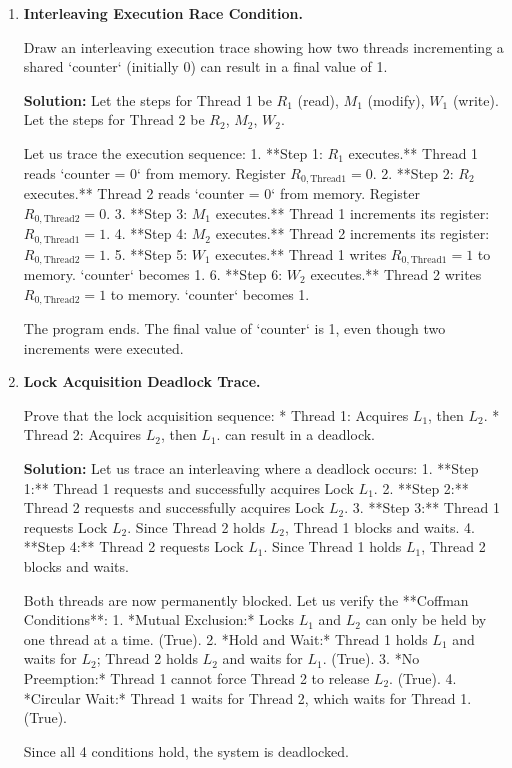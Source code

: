\documentclass[12pt, a4paper]{book}
\begin{document}
\begin{problembox}
\begin{enumerate}[label=\textbf{E\arabic*.}]
  \item \textbf{Interleaving Execution Race Condition.}
  
        Draw an interleaving execution trace showing how two threads incrementing a shared `counter` (initially 0) can result in a final value of 1.
        
        \textbf{Solution:}
        Let the steps for Thread 1 be $R_1$ (read), $M_1$ (modify), $W_1$ (write).
        Let the steps for Thread 2 be $R_2$, $M_2$, $W_2$.
        
        Let us trace the execution sequence:
        1. **Step 1: $R_1$ executes.**
           Thread 1 reads `counter = 0` from memory. Register $R_{0,\text{Thread1}} = 0$.
        2. **Step 2: $R_2$ executes.**
           Thread 2 reads `counter = 0` from memory. Register $R_{0,\text{Thread2}} = 0$.
        3. **Step 3: $M_1$ executes.**
           Thread 1 increments its register: $R_{0,\text{Thread1}} = 1$.
        4. **Step 4: $M_2$ executes.**
           Thread 2 increments its register: $R_{0,\text{Thread2}} = 1$.
        5. **Step 5: $W_1$ executes.**
           Thread 1 writes $R_{0,\text{Thread1}} = 1$ to memory. `counter` becomes 1.
        6. **Step 6: $W_2$ executes.**
           Thread 2 writes $R_{0,\text{Thread2}} = 1$ to memory. `counter` becomes 1.
        
        The program ends. The final value of `counter` is 1, even though two increments were executed.
        
  \item \textbf{Lock Acquisition Deadlock Trace.}
  
        Prove that the lock acquisition sequence:
        * Thread 1: Acquires $L_1$, then $L_2$.
        * Thread 2: Acquires $L_2$, then $L_1$.
        can result in a deadlock.
        
        \textbf{Solution:}
        Let us trace an interleaving where a deadlock occurs:
        1. **Step 1:** Thread 1 requests and successfully acquires Lock $L_1$.
        2. **Step 2:** Thread 2 requests and successfully acquires Lock $L_2$.
        3. **Step 3:** Thread 1 requests Lock $L_2$.
           Since Thread 2 holds $L_2$, Thread 1 blocks and waits.
        4. **Step 4:** Thread 2 requests Lock $L_1$.
           Since Thread 1 holds $L_1$, Thread 2 blocks and waits.
           
        Both threads are now permanently blocked.
        Let us verify the **Coffman Conditions**:
        1. *Mutual Exclusion:* Locks $L_1$ and $L_2$ can only be held by one thread at a time. (True).
        2. *Hold and Wait:* Thread 1 holds $L_1$ and waits for $L_2$; Thread 2 holds $L_2$ and waits for $L_1$. (True).
        3. *No Preemption:* Thread 1 cannot force Thread 2 to release $L_2$. (True).
        4. *Circular Wait:* Thread 1 waits for Thread 2, which waits for Thread 1. (True).
        
        Since all 4 conditions hold, the system is deadlocked.
\end{enumerate}
\end{problembox}
\end{document}
